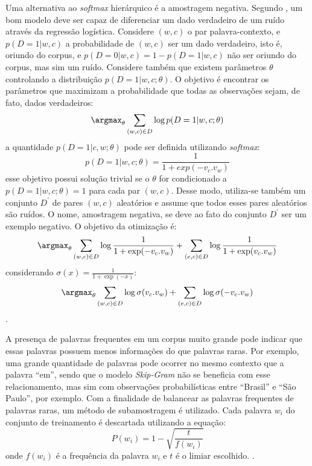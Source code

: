 Uma alternativa ao \textit{softmax} hierárquico é a amostragem negativa. Segundo \cite{Mikolov2013DistributedRepresentations}, um bom modelo deve ser capaz de diferenciar um dado verdadeiro de um ruído através da regressão logística. Considere $(w, c)$ o par palavra-contexto, e $p(D=1|w,c)$ a probabilidade de $(w,c)$ ser um dado verdadeiro, isto é, oriundo do corpus, e $p(D=0|w,c) = 1 - p(D=1|w,c)$ não ser oriundo do corpus, mas sim um ruído. Considere também que existem parâmetros $\theta$ controlando a distribuição $p(D=1|w,c;\theta)$. O objetivo é encontrar os parâmetros que maximizam a probabilidade que todas as observações sejam, de fato, dados verdadeiros:
\begin{equation}
    \label{eq:negative_sampling_expanded}
    \argmax_\theta \sum_{(w,c) \in D} \log p(D=1|w,c;\theta)
\end{equation}
a quantidade $p(D=1|c,w;\theta)$ pode ser definida utilizando \textit{softmax}:
\begin{equation}
    \label{eq:negative_sampling_softmax}
   p(D=1|w,c;\theta) = \frac{1}{1+exp(-v_c . v_w)}
\end{equation}
esse objetivo possui solução trivial se o $\theta$ for condicionado a $p(D=1|w,c;\theta)=1$ para cada par $(w,c)$. Desse modo, utiliza-se também um conjunto $D^\prime$ de pares $(w,c)$ aleatórios e assume que todos esses pares aleatórios são ruídos. O nome, amostragem negativa, se deve ao fato do conjunto $D^\prime$ ser um exemplo negativo. O objetivo da otimização é:
\begin{equation}
    \label{eq:negative_sampling_softmax_noise}
    \argmax_\theta \sum_{(w,c) \in D} \log \frac{1}{1+\exp(-v_c.v_w)} + \sum_{(e,c) \in D} \log \frac{1}{1+\exp(v_c . v_w)}
\end{equation}
considerando $\sigma(x) = \frac{1}{1+\exp(-x)}$:
\begin{equation}
    \label{eq:negative_sampling}
    \argmax_\theta \sum_{(w,c) \in D} \log \sigma(v_c .v_w) + \sum_{(e,c) \in D} \log \sigma(-v_c.v_w)
\end{equation}
\cite{Goldberg2014word2vecED}.

A presença de palavras frequentes em um corpus muito grande pode indicar que essas palavras possuem menos informações do que palavras raras. Por exemplo, uma grande quantidade de palavras pode    ocorrer no mesmo contexto que a palavra \enquote{em}, sendo que o modelo \textit{Skip-Gram} não se beneficia com esse relacionamento, mas sim com observações probabilísticas entre \enquote{Brasil} e \enquote{São Paulo}, por exemplo. Com a finalidade de balancear as palavras frequentes de palavras raras, um método de subamostragem é utilizado. Cada palavra $w_i$ do conjunto de treinamento é descartada utilizando a equação:
\begin{equation}
    \label{eq:skip_gram_sub_sampling}
    P(w_i) = 1 - \sqrt{\frac{t}{f(w_i)}}
\end{equation}
onde $f(w_i)$ é a frequência da palavra $w_i$ e $t$ é o limiar escolhido. \cite{Mikolov2013DistributedRepresentations}.

